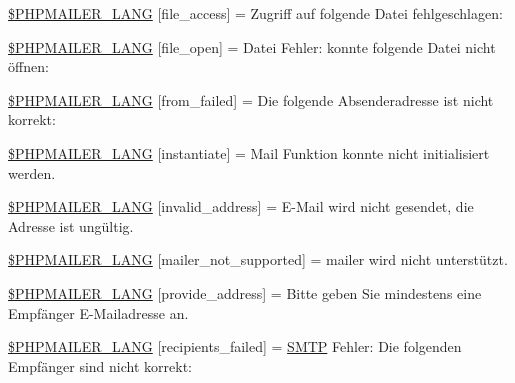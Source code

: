 \begin{DoxyCompactItemize}
\item 
\hyperlink{phpmailer_8lang-de_8php_a7e83349023b856ef9e5c46e30ae6d51e}{\$\+P\+H\+P\+M\+A\+I\+L\+E\+R\+\_\+\+L\+A\+NG} \mbox{[}\textquotesingle{}file\+\_\+access\textquotesingle{}\mbox{]} = \textquotesingle{}Zugriff auf folgende Datei fehlgeschlagen\+: \textquotesingle{}
\item 
\hyperlink{phpmailer_8lang-de_8php_a28d1a6517bf4c942a0ddd506188ad2e0}{\$\+P\+H\+P\+M\+A\+I\+L\+E\+R\+\_\+\+L\+A\+NG} \mbox{[}\textquotesingle{}file\+\_\+open\textquotesingle{}\mbox{]} = \textquotesingle{}Datei Fehler\+: konnte folgende Datei nicht öffnen\+: \textquotesingle{}
\item 
\hyperlink{phpmailer_8lang-de_8php_adf832ae12155a09be077c6d5e4fd7e22}{\$\+P\+H\+P\+M\+A\+I\+L\+E\+R\+\_\+\+L\+A\+NG} \mbox{[}\textquotesingle{}from\+\_\+failed\textquotesingle{}\mbox{]} = \textquotesingle{}Die folgende Absenderadresse ist nicht korrekt\+: \textquotesingle{}
\item 
\hyperlink{phpmailer_8lang-de_8php_ad58dde16780f4770ccf4dd282ea1f5ad}{\$\+P\+H\+P\+M\+A\+I\+L\+E\+R\+\_\+\+L\+A\+NG} \mbox{[}\textquotesingle{}instantiate\textquotesingle{}\mbox{]} = \textquotesingle{}Mail Funktion konnte nicht initialisiert werden.\textquotesingle{}
\item 
\hyperlink{phpmailer_8lang-de_8php_a42d61bcea4c79599ecb44fd062f54d47}{\$\+P\+H\+P\+M\+A\+I\+L\+E\+R\+\_\+\+L\+A\+NG} \mbox{[}\textquotesingle{}invalid\+\_\+address\textquotesingle{}\mbox{]} = \textquotesingle{}E-\/Mail wird nicht gesendet, die Adresse ist ungültig.\textquotesingle{}
\item 
\hyperlink{phpmailer_8lang-de_8php_aa2ebcb8833ee83a7ad67401c4bb3a6ad}{\$\+P\+H\+P\+M\+A\+I\+L\+E\+R\+\_\+\+L\+A\+NG} \mbox{[}\textquotesingle{}mailer\+\_\+not\+\_\+supported\textquotesingle{}\mbox{]} = \textquotesingle{} mailer wird nicht unterstützt.\textquotesingle{}
\item 
\hyperlink{phpmailer_8lang-de_8php_a8b97897c2406b7392b056f375feeefbb}{\$\+P\+H\+P\+M\+A\+I\+L\+E\+R\+\_\+\+L\+A\+NG} \mbox{[}\textquotesingle{}provide\+\_\+address\textquotesingle{}\mbox{]} = \textquotesingle{}Bitte geben Sie mindestens eine Empfänger E-\/Mailadresse an.\textquotesingle{}
\item 
\hyperlink{phpmailer_8lang-de_8php_a7589d30bb9b368327c2df015f3e6bcba}{\$\+P\+H\+P\+M\+A\+I\+L\+E\+R\+\_\+\+L\+A\+NG} \mbox{[}\textquotesingle{}recipients\+\_\+failed\textquotesingle{}\mbox{]} = \textquotesingle{}\hyperlink{class_s_m_t_p}{S\+M\+TP} Fehler\+: Die folgenden Empfänger sind nicht korrekt\+: \textquotesingle{}

\end{DoxyCompactItemize}
